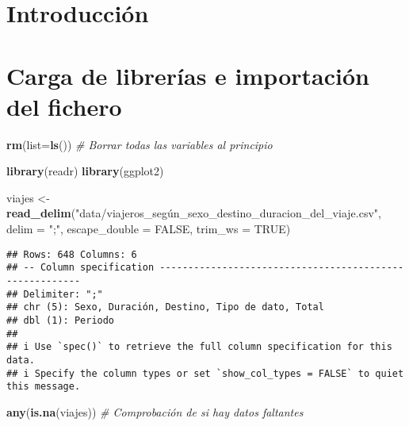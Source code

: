\documentclass[notspecified,article,submit,moreauthors,pdftex]{Definitions/mdpi}
\newenvironment{Shaded}{\begin{snugshade}}{\end{snugshade}}
\newcommand{\AttributeTok}[1]{\textcolor[rgb]{0.13,0.29,0.53}{#1}}
\newcommand{\CommentTok}[1]{\textcolor[rgb]{0.56,0.35,0.01}{\textit{#1}}}
\newcommand{\ConstantTok}[1]{\textcolor[rgb]{0.56,0.35,0.01}{#1}}
\newcommand{\FunctionTok}[1]{\textcolor[rgb]{0.13,0.29,0.53}{\textbf{#1}}}
\newcommand{\NormalTok}[1]{#1}
\newcommand{\OtherTok}[1]{\textcolor[rgb]{0.56,0.35,0.01}{#1}}
\newcommand{\StringTok}[1]{\textcolor[rgb]{0.31,0.60,0.02}{#1}}
\begin{document}

\section{Introducción}\label{introducciuxf3n}

\section{Carga de librerías e importación del
fichero}\label{carga-de-libreruxedas-e-importaciuxf3n-del-fichero}

\begin{Shaded}
\begin{Highlighting}[]
\FunctionTok{rm}\NormalTok{(}\AttributeTok{list=}\FunctionTok{ls}\NormalTok{())  }\CommentTok{\# Borrar todas las variables al principio}
\end{Highlighting}
\end{Shaded}

\begin{Shaded}
\begin{Highlighting}[]
\FunctionTok{library}\NormalTok{(readr)}
\FunctionTok{library}\NormalTok{(ggplot2)}
\end{Highlighting}
\end{Shaded}

\begin{Shaded}
\begin{Highlighting}[]
\NormalTok{viajes }\OtherTok{\textless{}{-}} \FunctionTok{read\_delim}\NormalTok{(}\StringTok{"data/viajeros\_según\_sexo\_destino\_duracion\_del\_viaje.csv"}\NormalTok{, }\AttributeTok{delim =} \StringTok{";"}\NormalTok{, }\AttributeTok{escape\_double =} \ConstantTok{FALSE}\NormalTok{, }\AttributeTok{trim\_ws =} \ConstantTok{TRUE}\NormalTok{)}
\end{Highlighting}
\end{Shaded}

\begin{verbatim}
## Rows: 648 Columns: 6
## -- Column specification --------------------------------------------------------
## Delimiter: ";"
## chr (5): Sexo, Duración, Destino, Tipo de dato, Total
## dbl (1): Periodo
## 
## i Use `spec()` to retrieve the full column specification for this data.
## i Specify the column types or set `show_col_types = FALSE` to quiet this message.
\end{verbatim}

\begin{Shaded}
\begin{Highlighting}[]
\FunctionTok{any}\NormalTok{(}\FunctionTok{is.na}\NormalTok{(viajes))  }\CommentTok{\# Comprobación de si hay datos faltantes}
\end{Highlighting}
\end{Shaded}
\end{document}
